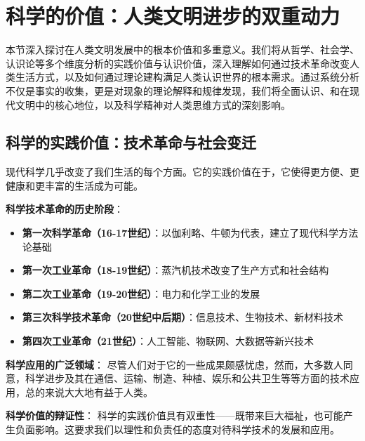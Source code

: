 \section{科学的价值：人类文明进步的双重动力}

\begin{logicbox}[title=引言]
本节深入探讨在人类文明发展中的根本价值和多重意义。我们将从哲学、社会学、认识论等多个维度分析的实践价值与认识价值，深入理解如何通过技术革命改变人类生活方式，以及如何通过理论建构满足人类认识世界的根本需求。通过系统分析不仅是事实的收集，更是对现象的理论解释和规律发现，我们将全面认识、和在现代文明中的核心地位，以及科学精神对人类思维方式的深刻影响。
\end{logicbox}

\subsection{科学的实践价值：技术革命与社会变迁}

\begin{theorembox}[title=科学实践价值的历史演进]
现代科学几乎改变了我们生活的每个方面。它的实践价值在于，它使得更方便、更健康和更丰富的生活成为可能。

\textbf{科学技术革命的历史阶段}：
\begin{itemize}
\item \textbf{第一次科学革命（16-17世纪）}：以伽利略、牛顿为代表，建立了现代科学方法论基础
\item \textbf{第一次工业革命（18-19世纪）}：蒸汽机技术改变了生产方式和社会结构
\item \textbf{第二次工业革命（19-20世纪）}：电力和化学工业的发展
\item \textbf{第三次科学技术革命（20世纪中后期）}：信息技术、生物技术、新材料技术
\item \textbf{第四次工业革命（21世纪）}：人工智能、物联网、大数据等新兴技术
\end{itemize}

\textbf{科学应用的广泛领域}：
尽管人们对于它的一些成果颇感忧虑，然而，大多数人同意，科学进步及其在通信、运输、制造、种植、娱乐和公共卫生等等方面的技术应用，总的来说大大地有益于人类。

\textbf{科学价值的辩证性}：
科学的实践价值具有双重性——既带来巨大福祉，也可能产生负面影响。这要求我们以理性和负责任的态度对待科学技术的发展和应用。
\end{theorembox}

